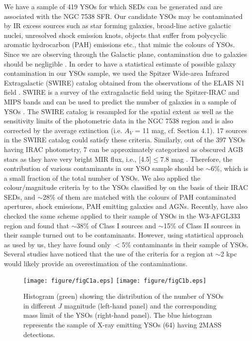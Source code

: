 \documentclass[a4paper,fleqn,usenatbib,useAMS]{mnras}
\begin{document}
We have a sample of 419 YSOs for which SEDs can be generated and are associated with the NGC 7538 SFR. 
Our candidate YSOs may be contaminated by IR excess sources such as star forming galaxies, 
broad-line active galactic nuclei, unresolved shock emission knots, objects that suffer from polycyclic aromatic hydrocarbon (PAH) emissions etc.,
that mimic the colours of YSOs. Since we are observing through the Galactic plane, contamination due
to galaxies should be negligible \citep{2015A&A...573A..95M}.  In order to have a statistical estimate of possible
galaxy contamination in our YSOs sample, we used the Spitzer Wide-area Infrared Extragalactic (SWIRE) catalog 
obtained from the observations of the ELAIS N1 field \citep{2013MNRAS.428.1958R}. SWIRE is a survey of the
extragalactic field using the Spitzer-IRAC and MIPS bands and can be used to predict the number of galaxies 
in a sample of YSOs \citep{2009ApJS..181..321E}.  
The SWIRE catalog is resampled for the spatial extent
as well as the sensitivity limits of the photometric data in the NGC 7538 region and is also corrected by the average extinction
(i.e. $A_V$ = 11 mag, cf. Section 4.1). 
17 sources in the SWIRE catalog could satisfy these criteria.
Similarly, out of the 397 YSOs having IRAC photometry, 7 can be approximately categorized as
obscured AGB stars as they have very bright MIR flux, i.e., [4.5]$\leq$7.8 mag \citep[cf.][]{2008AJ....136.2413R}.
Therefore, the contribution of various contaminants in
our YSO sample should be $\sim$6\%, which is a small fraction of the total number of YSOs. 
We also applied the colour/magnitude criteria by \citet{2009ApJS..184...18G} to the YSOs classified by  \citet{2014MNRAS.439.3719C}
on the basis of their IRAC SEDs, and $\sim$28\% of them are matched with the colours 
of PAH contaminated apertures, shock emissions, PAH emitting galaxies and AGNs. 
Recently, \citet{2016ApJ...822...49J} have also checked the same scheme applied to their sample of YSOs in the W3-AFGL333 region 
and found that $\sim$38\% of Class I sources and $\sim$15\% of Class II sources in their sample turned out to be  contaminants.
However,  using statistical approach as used by us, they have found only $<$5\% contaminants in their sample of YSOs. 
Several studies \citep[e.g.,][]{2008ApJ...688.1142K,2011ApJ...743...39R,2013ApJ...778...96W}
have noticed that the use of the \citet{2009ApJS..184...18G}  criteria for a region at $\sim$2 kpc
would likely provide an overestimation of the contaminations.


\begin{figure}
\centering\texttt{[image: figure/figC1a.eps]}
\centering\texttt{[image: figure/figC1b.eps]}
\caption{\label{FcftJ} Histogram (green) showing the distribution of the number of YSOs in different $J$ magnitude (left-hand panel) and the
corresponding mass limit of the YSOs (right-hand panel).
The blue histogram represents the sample of X-ray emitting YSOs (64) having 2MASS detections.
}
\end{figure}
\end{document}
